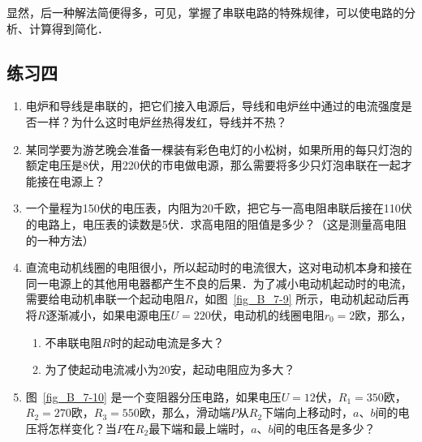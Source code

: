 显然，后一种解法简便得多，可见，掌握了串联电路的特殊规律，可以使电路的分析、计算得到简化．

\subsection*{练习四}
\begin{enumerate}
    \item 电炉和导线是串联的，把它们接入电源后，导线和电炉丝中通过的电流强度是否一样？为什么这时电炉丝热得发红，导线并不热？
    \item 某同学要为游艺晚会准备一棵装有彩色电灯的小松树，如果所用的每只灯泡的额定电压是8伏，用220伏的市电做电源，那么需要将多少只灯泡串联在一起才能接在电源上？
    \item 一个量程为150伏的电压表，内阻为20千欧，把它与一高电阻串联后接在110伏的电路上，电压表的读数是5伏．求高电阻的阻值是多少？（这是测量高电阻的一种方法）
    \item 直流电动机线圈的电阻很小，所以起动时的电流很大，这对电动机本身和接在同一电源上的其他用电器都产生不良的后果．为了减小电动机起动时的电流，需要给电动机串联一个起动电阻$R$，如图~\ref{fig_B_7-9} 所示，电动机起动后再将$R$逐渐减小，如果电源电压$U=220$伏，电动机的线圈电阻$r_0=2$欧，那么，
    
    \begin{enumerate}
        \item 不串联电阻$R$时的起动电流是多大？
        \item 为了使起动电流减小为20安，起动电阻应为多大？
    \end{enumerate}
    \item 图~\ref{fig_B_7-10} 是一个变阻器分压电路，如果电压$U=12$伏，$R_1=350$欧，$R_2=270$欧，$R_3=550$欧，那么，滑动端$P$从$R_2$下端向上移动时，$a$、$b$间的电压将怎样变化？当$P$在$R_2$最下端和最上端时，$a$、$b$间的电压各是多少？	
\end{enumerate}

